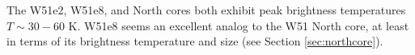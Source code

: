 

The W51e2, W51e8, and North cores both exhibit peak brightness temperatures
$T\sim30-60$ K.  W51e8 seems an excellent analog to the W51 North core, at
least in terms of its brightness temperature and size (see Section
\ref{sec:northcore}).  






